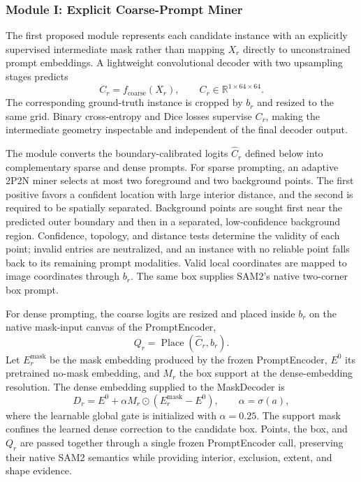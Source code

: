 \documentclass[letterpaper,journal]{IEEEtran}
\begin{document}
\subsubsection{Module I: Explicit Coarse-Prompt Miner}
The first proposed module represents each candidate instance with an explicitly supervised intermediate mask rather than mapping $X_r$ directly to unconstrained prompt embeddings. A lightweight convolutional decoder with two upsampling stages predicts
\begin{equation}
C_r=f_{\mathrm{coarse}}(X_r), \qquad
C_r\in\mathbb{R}^{1\times64\times64}.
\label{eq:coarse_logits}
\end{equation}
The corresponding ground-truth instance is cropped by $b_r$ and resized to the same grid. Binary cross-entropy and Dice losses supervise $C_r$, making the intermediate geometry inspectable and independent of the final decoder output.

The module converts the boundary-calibrated logits $\widehat C_r$ defined below into complementary sparse and dense prompts. For sparse prompting, an adaptive 2P2N miner selects at most two foreground and two background points. The first positive favors a confident location with large interior distance, and the second is required to be spatially separated. Background points are sought first near the predicted outer boundary and then in a separated, low-confidence background region. Confidence, topology, and distance tests determine the validity of each point; invalid entries are neutralized, and an instance with no reliable point falls back to its remaining prompt modalities. Valid local coordinates are mapped to image coordinates through $b_r$. The same box supplies SAM2's native two-corner box prompt.

For dense prompting, the coarse logits are resized and placed inside $b_r$ on the native mask-input canvas of the PromptEncoder,
\begin{equation}
Q_r=\operatorname{Place}(\widehat C_r,b_r).
\label{eq:dense_canvas}
\end{equation}
Let $E_r^{\mathrm{mask}}$ be the mask embedding produced by the frozen PromptEncoder, $E^0$ its pretrained no-mask embedding, and $M_r$ the box support at the dense-embedding resolution. The dense embedding supplied to the MaskDecoder is
\begin{equation}
D_r=E^0+\alpha M_r\odot
\left(E_r^{\mathrm{mask}}-E^0\right),
\qquad \alpha=\sigma(a),
\label{eq:dense_prompt_gate}
\end{equation}
where the learnable global gate is initialized with $\alpha=0.25$. The support mask confines the learned dense correction to the candidate box. Points, the box, and $Q_r$ are passed together through a single frozen PromptEncoder call, preserving their native SAM2 semantics while providing interior, exclusion, extent, and shape evidence.
\end{document}
